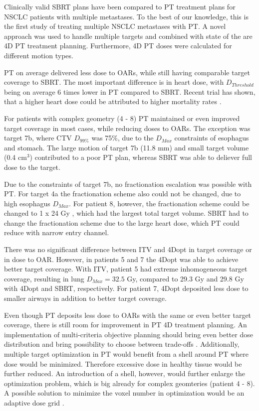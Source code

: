 \documentclass[type=dr, dr=rernat, accentcolor=tud7b,colorbacktitle, bigchapter, openright, twoside, 12pt ]{tudthesis}
\begin{document}
Clinically valid SBRT plans have been compared to PT treatment plans for NSCLC patients with multiple metastases. 
To the best of our knowledge, this is the first study of treating multiple NSCLC metastases with PT. A novel approach was used to handle multiple targets and combined
with state of the are 4D PT treatment planning. Furthermore, 4D PT doses were calculated for different motion types. 

PT on average delivered less dose to OARs, while still having comparable target coverage to SBRT.
The most important difference is in heart dose, with $D_{Threshold}$ being on average 6 times lower in PT compared to SBRT. Recent trial has shown,
that a higher heart dose could be attributed to higher mortality rates \cite{Bradley2015}.

For patients with complex geometry (4 - 8) PT maintained or even improved target coverage in most cases, while reducing doses to OARs.
The exception was target 7b, where CTV $D_{99\%}$ was 75\%, due to the $D_{Max}$ constraints of esophagus and stomach.
The large motion of target 7b (11.8 mm) and small target volume (0.4 cm$^3$) contributed to a poor PT plan, whereas SBRT was able to deliever full dose to the target.

Due to the constraints of target 7b, no fractionation escalation was possible with PT. For target 4a the fractionation scheme also could not be changed,
due to high esophagus $D_{Max}$. For patient 8, however, the fractionation scheme could be changed to 1 x 24 Gy , which had the largest total target volume. 
SBRT had to change the fractionation scheme due to the large heart dose, which PT could reduce with narrow entry
channel.

There was no significant difference between ITV and 4Dopt in target coverage or in dose to OAR. 
However, in patients 5 and 7 the 4Dopt was able to achieve better target coverage. With ITV, patient 5 had extreme inhomogeneous target coverage, resulting in lung $D_{Max} = 32.5$ Gy,
compared to 29.3 Gy and 29.8 Gy with 4Dopt and SBRT, respectively. For patient 7, 4Dopt deposited less dose to smaller airways in addition to better target coverage.


Even though PT deposits less dose to OARs with the same or even better target coverage, there is still room for improvement in PT 4D treatment planning. 
An implementation of multi-criteria objective planning should bring even better dose distribution and bring possibility to choose between trade-offs \cite{Breedveld2007, Chen2010}. 
Additionally, multiple target optimization in PT would benefit from a shell around PT where dose would be minimized. Therefore excessive dose
in healthy tissue would be further reduced. An introduction of a shell, however, would further enlarge the optimization problem, which is big already for complex geomteries (patient 4 - 8). 
A possible solution to minimize the voxel number in optimization would be an adaptive dose grid \cite{Prall2016a}.
\end{document}
